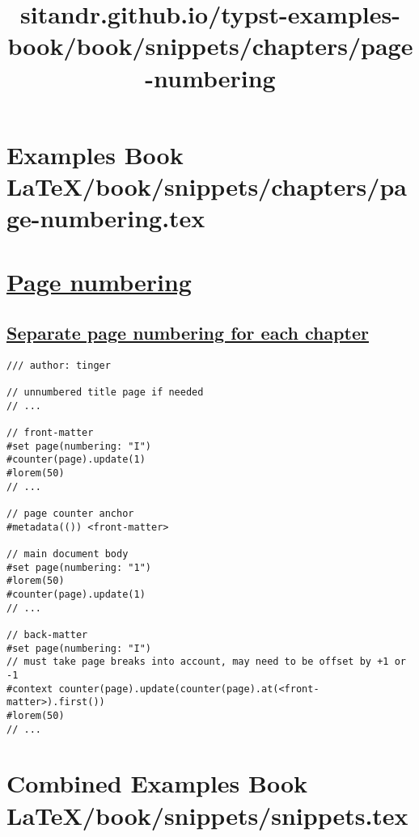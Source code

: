 \section{Examples Book LaTeX/book/snippets/chapters/page-numbering.tex}
\title{sitandr.github.io/typst-examples-book/book/snippets/chapters/page-numbering}

\section{\texorpdfstring{\hyperref[page-numbering]{Page
numbering}}{Page numbering}}\label{page-numbering}

\subsection{\texorpdfstring{\hyperref[separate-page-numbering-for-each-chapter]{Separate
page numbering for each
chapter}}{Separate page numbering for each chapter}}\label{separate-page-numbering-for-each-chapter}

\begin{verbatim}
/// author: tinger

// unnumbered title page if needed
// ...

// front-matter
#set page(numbering: "I")
#counter(page).update(1)
#lorem(50)
// ...

// page counter anchor
#metadata(()) <front-matter>

// main document body
#set page(numbering: "1")
#lorem(50)
#counter(page).update(1)
// ...

// back-matter
#set page(numbering: "I")
// must take page breaks into account, may need to be offset by +1 or -1
#context counter(page).update(counter(page).at(<front-matter>).first())
#lorem(50)
// ...
\end{verbatim}

\pandocbounded{}

\pandocbounded{}

\pandocbounded{}




\section{Combined Examples Book LaTeX/book/snippets/snippets.tex}
